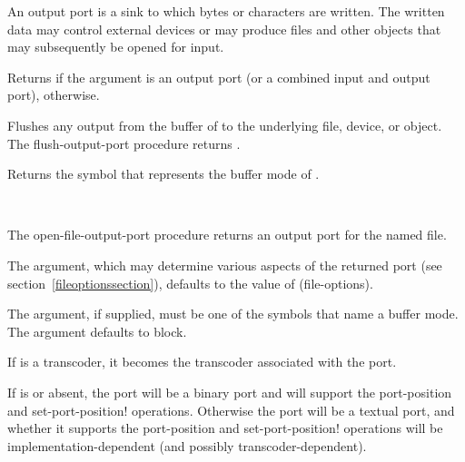 An output port is a sink to which bytes or characters are written.
The written data may control
external devices or may produce files and other objects that may
subsequently be opened for input.

\begin{entry}{%
}
   
Returns \schtrue{} if the argument is an output port (or a
combined input and output port), \schfalse{} otherwise.
\end{entry}   

\begin{entry}{%
}
   
Flushes any output from the buffer of  to the
underlying file, device, or object. The {\cf flush-output-port}
procedure returns \unspecifiedreturn.
\end{entry}

\begin{entry}{%
}
   
Returns the symbol that represents the buffer mode of
.
\end{entry}

\begin{entry}{%
\\
}


The {\cf open-file-output-port} procedure returns an output port for the named file.

The  argument, which may determine
various aspects of the returned port (see section~\ref{fileoptionssection}),
defaults to the value of {\cf (file-options)}.

The  argument, if supplied,
must be one of the symbols that name a buffer mode.
The  argument defaults to {\cf block}.

If  is a transcoder, it becomes the transcoder
associated with the port.

If  is \schfalse{} or absent,
the port will be a binary port and will support the
{\cf port-position} and {\cf set-port-position!}  operations.
Otherwise the port will be a textual port, and whether it supports
the {\cf port-position} and {\cf set-port-position!} operations
will be implementation-dependent (and possibly transcoder-dependent).
\end{entry}   

